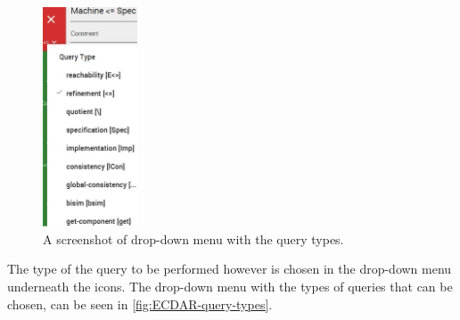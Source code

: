 \begin{figure}[H]
    \centering
    \includegraphics[width=0.25\textwidth]{common/figures/check-type.jpg}
    \caption{A screenshot of drop-down menu with the query types.}
    \label{fig:ECDAR-query-types}
\end{figure}

The type of the query to be performed however is chosen in the drop-down menu underneath the icons. 
The drop-down menu with the types of queries that can be chosen, can be seen in \autoref{fig:ECDAR-query-types}.

